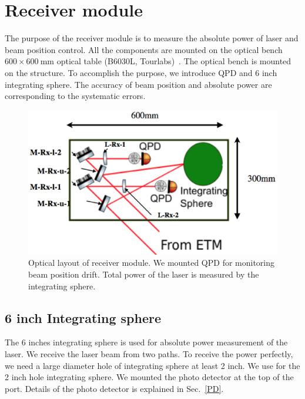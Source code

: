 \section{Receiver module}
The purpose of the receiver module is to measure the absolute power of laser and beam position control.
All the components are mounted on the optical bench $600 \times 600~\mathrm{mm}$ optical table (B6030L, Tourlabs)~\cite{Thorlabs}. 
The optical bench is mounted on the structure.
To accomplish the purpose, we introduce QPD and  6 inch integrating sphere.
The accuracy of beam position and absolute power are corresponding to the systematic errors. 
\begin{figure}
\begin{center}
\includegraphics[width=14cm]{Figures/Rx_module_layout.eps}
\caption{Optical layout of receiver module. We mounted QPD for monitoring beam position drift. Total power of the laser is measured by the integrating sphere.} 
\label{fig:Rx_module_layout} 
\end{center}
\end{figure}
\subsection{6 inch Integrating sphere}
The 6 inches integrating sphere is used for absolute power measurement of the laser. We receive the laser beam from two paths. To receive the power perfectly, we need a large diameter hole of integrating sphere at least 2 inch. We use for the 2 inch hole integrating sphere. We mounted the photo detector at the top of the port. Details of the photo detector is explained in Sec.~\ref{PD}.

